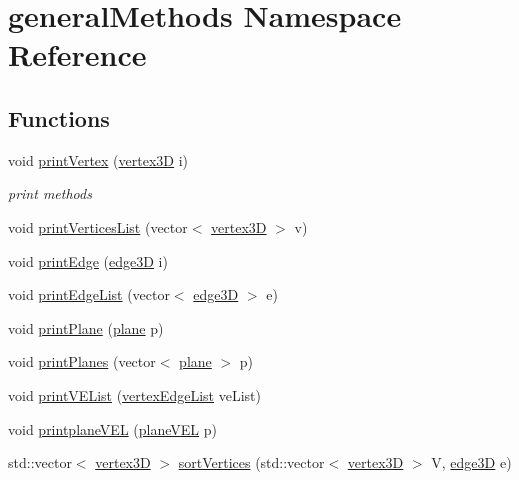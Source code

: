 \hypertarget{namespacegeneral_methods}{}\section{general\+Methods Namespace Reference}
\label{namespacegeneral_methods}
\subsection*{Functions}
\begin{DoxyCompactItemize}
\item 
void \mbox{\hyperlink{namespacegeneral_methods_a694306c7472ee1bbfb3c90c0f3d5453a}{print\+Vertex}} (\mbox{\hyperlink{structvertex3_d}{vertex3D}} i)
\begin{DoxyCompactList}\small\item\em print methods \end{DoxyCompactList}\item 
void \mbox{\hyperlink{namespacegeneral_methods_a9cbf7d7c2019f0e2b6f9773b687b50cd}{print\+Vertices\+List}} (vector$<$ \mbox{\hyperlink{structvertex3_d}{vertex3D}} $>$ v)
\item 
void \mbox{\hyperlink{namespacegeneral_methods_af9a1c28dacf89e746b51916fe178ce1a}{print\+Edge}} (\mbox{\hyperlink{structedge3_d}{edge3D}} i)
\item 
void \mbox{\hyperlink{namespacegeneral_methods_ab6b6f8a5d92b39ead6c97ec0917b75a4}{print\+Edge\+List}} (vector$<$ \mbox{\hyperlink{structedge3_d}{edge3D}} $>$ e)
\item 
void \mbox{\hyperlink{namespacegeneral_methods_a3474d24f9f545407bb5f73250a5e19d7}{print\+Plane}} (\mbox{\hyperlink{structplane}{plane}} p)
\item 
void \mbox{\hyperlink{namespacegeneral_methods_aa7c9b8abc94ae6b08d2cf083a08eaf21}{print\+Planes}} (vector$<$ \mbox{\hyperlink{structplane}{plane}} $>$ p)
\item 
void \mbox{\hyperlink{namespacegeneral_methods_a60a9e0ba058824389fc703dc2dbbb7e3}{print\+V\+E\+List}} (\mbox{\hyperlink{structvertex_edge_list}{vertex\+Edge\+List}} ve\+List)
\item 
void \mbox{\hyperlink{namespacegeneral_methods_adc8e104a2f2ed35a22be9a68051ec38d}{printplane\+V\+EL}} (\mbox{\hyperlink{structplane_v_e_l}{plane\+V\+EL}} p)
\item 
std\+::vector$<$ \mbox{\hyperlink{structvertex3_d}{vertex3D}} $>$ \mbox{\hyperlink{namespacegeneral_methods_ace3487740f3b46dce9e0357366abf9ed}{sort\+Vertices}} (std\+::vector$<$ \mbox{\hyperlink{structvertex3_d}{vertex3D}} $>$ V, \mbox{\hyperlink{structedge3_d}{edge3D}} e)

\end{DoxyCompactItemize}
